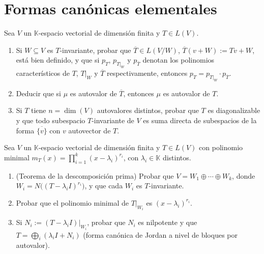 \documentclass{article}
\newcommand{\K}{\mathbb{K}}
\DeclareMathOperator{\dimm}{dim}
\newcommand{\gen}[1]{\overline{\{#1\}}}          %
\newcommand{\restr}[2]{{#1}\big|_{#2}}            %
\theoremstyle{plain}
\theoremstyle{definition}
\theoremstyle{remark}
\newenvironment{ejercicio}[1]{\begin{trivlist}
\item[\hskip \labelsep {\bfseries Ejercicio}\hskip \labelsep {\bfseries #1.}]}{\end{trivlist}}
\begin{document}
\section{Formas canónicas elementales}

\begin{ejercicio}{9}
    Sea \(V\) un \(\K\)-espacio vectorial de dimensión finita y \(T \in L(V)\).
    \begin{enumerate}
        \item Si \(W \subseteq V\) es \(T\)-invariante, probar que \(\overline T \in L(V/W)\), \(\overline T(v+W) := Tv+W\), está bien definido, y que si \(p_T\), \(p_{\restr{T}{W}}\) y \(p_{\overline T}\) denotan los polinomios característicos de \(T\), \(\restr{T}{W}\) y \(\overline T\) respectivamente, entonces \(p_T = p_{\restr{T}{W}} \cdot p_{\overline T}\).
        \item Deducir que si \(\mu\) es autovalor de \(\overline T\), entonces \(\mu\) es autovalor de \(T\).
        \item Si \(T\) tiene \(n = \dimm(V)\) autovalores distintos, probar que \(T\) es diagonalizable y que todo subespacio \(T\)-invariante de \(V\) es suma directa de subespacios de la forma \(\gen{v}\) con \(v\) autovector de \(T\).
    \end{enumerate}
\end{ejercicio}

\begin{ejercicio}{10}
    Sea \(V\) un \(\K\)-espacio vectorial de dimensión finita y \(T \in L(V)\) con polinomio minimal \(m_T(x) = \prod_{i=1}^k (x-\lambda_i)^{r_i}\), con \(\lambda_i \in \K\) distintos.
    \begin{enumerate}
        \item (Teorema de la descomposición prima) Probar que \(V = W_1 \oplus \cdots \oplus W_k\), donde \(W_i = N\big((T-\lambda_i I)^{r_i}\big)\), y que cada \(W_i\) es \(T\)-invariante.
        \item Probar que el polinomio minimal de \(\restr{T}{W_i}\) es \((x-\lambda_i)^{r_i}\).
        \item Si \(N_i := \restr{(T-\lambda_i I)}{W_i}\), probar que \(N_i\) es nilpotente y que \(T = \bigoplus_i (\lambda_i I + N_i)\) (forma canónica de Jordan a nivel de bloques por autovalor).
    \end{enumerate}
\end{ejercicio}
\end{document}
